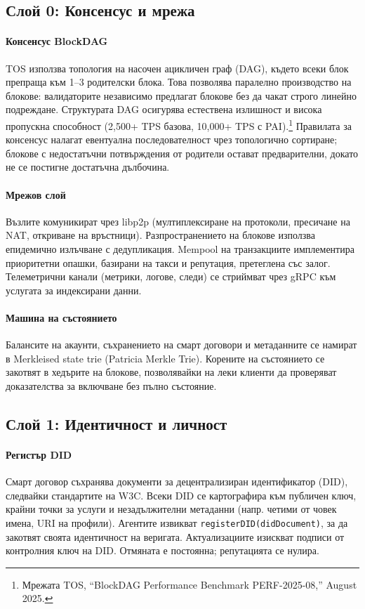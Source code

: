 \documentclass[11pt]{article}
\begin{document}
\subsection{Слой 0: Консенсус и мрежа}
\paragraph{Консенсус BlockDAG} TOS използва топология на насочен ацикличен граф (DAG), където всеки блок препраща към 1--3 родителски блока. Това позволява паралелно производство на блокове: валидаторите независимо предлагат блокове без да чакат строго линейно подреждане. Структурата DAG осигурява естествена излишност и висока пропускна способност (2,500+ TPS базова, 10,000+ TPS с PAI).\footnote{Мрежата TOS, ``BlockDAG Performance Benchmark PERF-2025-08,'' August 2025.} Правилата за консенсус налагат евентуална последователност чрез топологично сортиране; блокове с недостатъчни потвърждения от родители остават предварителни, докато не се постигне достатъчна дълбочина.

\paragraph{Мрежов слой} Възлите комуникират чрез libp2p (мултиплексиране на протоколи, пресичане на NAT, откриване на връстници). Разпространението на блокове използва епидемично излъчване с дедупликация. Mempool на транзакциите имплементира приоритетни опашки, базирани на такси и репутация, претеглена със залог. Телеметрични канали (метрики, логове, следи) се стриймват чрез gRPC към услугата за индексирани данни.

\paragraph{Машина на състоянието} Балансите на акаунти, съхранението на смарт договори и метаданните се намират в Merkleised state trie (Patricia Merkle Trie). Корените на състоянието се закотвят в хедърите на блокове, позволявайки на леки клиенти да проверяват доказателства за включване без пълно състояние.

\subsection{Слой 1: Идентичност и личност}
\paragraph{Регистър DID} Смарт договор съхранява документи за децентрализиран идентификатор (DID), следвайки стандартите на W3C. Всеки DID се картографира към публичен ключ, крайни точки за услуги и незадължителни метаданни (напр. четими от човек имена, URI на профили). Агентите извикват \texttt{registerDID(didDocument)}, за да закотвят своята идентичност на веригата. Актуализациите изискват подписи от контролния ключ на DID. Отмяната е постоянна; репутацията се нулира.
\end{document}
